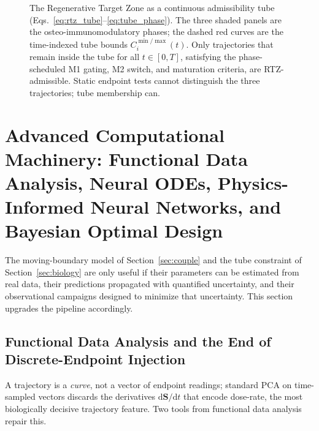 \documentclass[11pt]{article}
\newcommand{\dd}{\mathrm{d}}
\begin{document}
\begin{figure}[H]
\centering

\caption{The Regenerative Target Zone as a continuous admissibility tube (Eqs.~\eqref{eq:rtz_tube}--\eqref{eq:tube_phase}). The three shaded panels are the osteo-immunomodulatory phases; the dashed red curves are the time-indexed tube bounds $C_{i}^{\min/\max}(t)$. Only trajectories that remain inside the tube for all $t\in[0,T]$, satisfying the phase-scheduled M1 gating, M2 switch, and maturation criteria, are RTZ-admissible. Static endpoint tests cannot distinguish the three trajectories; tube membership can.}
\label{fig:rtz}
\end{figure}

\FloatBarrier



\section{Advanced Computational Machinery: Functional Data Analysis, Neural ODEs, Physics-Informed Neural Networks, and Bayesian Optimal Design}
\label{sec:comp}


The moving-boundary model of Section~\ref{sec:couple} and the tube constraint of Section~\ref{sec:biology} are only useful if their parameters can be estimated from real data, their predictions propagated with quantified uncertainty, and their observational campaigns designed to minimize that uncertainty. This section upgrades the pipeline accordingly.


\subsection{Functional Data Analysis and the End of Discrete-Endpoint Injection}


A trajectory is a \emph{curve}, not a vector of endpoint readings; standard PCA on time-sampled vectors discards the derivatives $\dd\mathbf{S}/\dd t$ that encode dose-rate, the most biologically decisive trajectory feature. Two tools from functional data analysis repair this.
\end{document}
